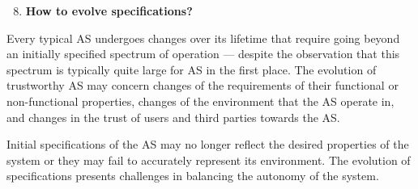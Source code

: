 \documentclass[sigconf,nonacm]{acmart}%
\begin{document}
	
	
\begin{enumerate}[leftmargin=0.5cm]
		\setcounter{enumi}{7}
	\item \textbf{How to evolve specifications?}
\end{enumerate}
Every typical AS undergoes changes over its lifetime that require going beyond an initially specified spectrum of operation --- despite the observation that this spectrum is typically quite large for AS in the first place. The evolution of trustworthy AS may concern changes of the requirements of their functional or non-functional properties, changes of the environment that the AS operate in, and changes in the trust of users and third parties towards the AS. 

Initial specifications of the AS may no longer reflect the desired properties of the system or they may fail to accurately represent its environment. The evolution of specifications presents challenges in balancing the autonomy of the system.
\end{document}
